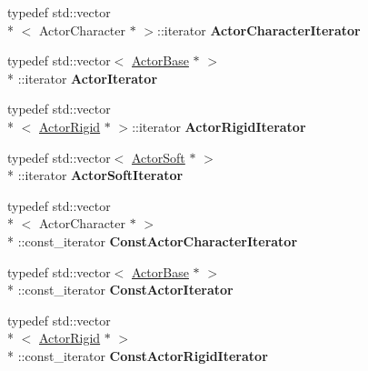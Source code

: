 \begin{DoxyCompactItemize}
\item 
\hypertarget{classMezzanine_1_1ActorManager_a436b56aadfc9f939454be461c904b8e5}{typedef std\-::vector\\*
$<$ Actor\-Character $\ast$ $>$\-::iterator {\bfseries Actor\-Character\-Iterator}}\label{classMezzanine_1_1ActorManager_a436b56aadfc9f939454be461c904b8e5}

\item 
\hypertarget{classMezzanine_1_1ActorManager_a7adacffc50a291974d306a3008c18b87}{typedef std\-::vector$<$ \hyperlink{classMezzanine_1_1ActorBase}{Actor\-Base} $\ast$ $>$\\*
\-::iterator {\bfseries Actor\-Iterator}}\label{classMezzanine_1_1ActorManager_a7adacffc50a291974d306a3008c18b87}

\item 
\hypertarget{classMezzanine_1_1ActorManager_ac4f47c8bddcfec7a4ae2904db967e020}{typedef std\-::vector\\*
$<$ \hyperlink{classMezzanine_1_1ActorRigid}{Actor\-Rigid} $\ast$ $>$\-::iterator {\bfseries Actor\-Rigid\-Iterator}}\label{classMezzanine_1_1ActorManager_ac4f47c8bddcfec7a4ae2904db967e020}

\item 
\hypertarget{classMezzanine_1_1ActorManager_af182ad519a3381e8893a29db11b037db}{typedef std\-::vector$<$ \hyperlink{classMezzanine_1_1ActorSoft}{Actor\-Soft} $\ast$ $>$\\*
\-::iterator {\bfseries Actor\-Soft\-Iterator}}\label{classMezzanine_1_1ActorManager_af182ad519a3381e8893a29db11b037db}

\item 
\hypertarget{classMezzanine_1_1ActorManager_a985136f1466c825eb2f4437243e0d892}{typedef std\-::vector\\*
$<$ Actor\-Character $\ast$ $>$\\*
\-::const\-\_\-iterator {\bfseries Const\-Actor\-Character\-Iterator}}\label{classMezzanine_1_1ActorManager_a985136f1466c825eb2f4437243e0d892}

\item 
\hypertarget{classMezzanine_1_1ActorManager_ac623530bb722052c2f90e2e737d01f27}{typedef std\-::vector$<$ \hyperlink{classMezzanine_1_1ActorBase}{Actor\-Base} $\ast$ $>$\\*
\-::const\-\_\-iterator {\bfseries Const\-Actor\-Iterator}}\label{classMezzanine_1_1ActorManager_ac623530bb722052c2f90e2e737d01f27}

\item 
\hypertarget{classMezzanine_1_1ActorManager_a08bfd16e9ea28fc9941aeb19a10145e2}{typedef std\-::vector\\*
$<$ \hyperlink{classMezzanine_1_1ActorRigid}{Actor\-Rigid} $\ast$ $>$\\*
\-::const\-\_\-iterator {\bfseries Const\-Actor\-Rigid\-Iterator}}\label{classMezzanine_1_1ActorManager_a08bfd16e9ea28fc9941aeb19a10145e2}


\end{DoxyCompactItemize}
